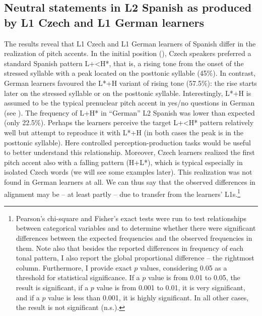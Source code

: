 \subsection{Neutral statements in L2 Spanish as produced by L1 Czech and L1 German learners}\label{sec:4.1.2}

The results reveal that L1 Czech and L1 German learners of Spanish differ in the realization of pitch accents. In the initial position (), Czech speakers preferred a standard Spanish pattern L+<H*, that is, a rising tone from the onset of the stressed syllable with a peak located on the posttonic syllable (45\%). In contrast, German learners favoured the L*+H variant of rising tone (57.5\%): the rise starts later on the stressed syllable or on the posttonic syllable. Interestingly, L*+H is assumed to be the typical prenuclear pitch accent in yes/no questions in German (see ). The frequency of L+H* in “German” L2 Spanish was lower than expected (only 22.5\%). Perhaps the learners perceive the target L+<H* pattern relatively well but attempt to reproduce it with L*+H (in both cases the peak is in the posttonic syllable). Here controlled perception-production tasks would be useful to better understand this relationship. Moreover, Czech learners realized the first pitch accent also with a falling pattern (H+L*), which is typical especially in isolated Czech words (we will see some examples later). This realization was not found in German learners at all. We can thus say that the observed differences in alignment may be -- at least partly -- due to transfer from the learners’ L1s.\footnote{Pearson’s chi-square and Fisher’s exact tests were run to test relationships between categorical variables and to determine whether there were significant differences between the expected frequencies and the observed frequencies in them. Note also that besides the reported differences in frequency of each tonal pattern, I also report the global proportional difference -- the rightmost column. Furthermore, I provide exact $p$ values, considering 0.05 as a threshold for statistical significance. If a $p$ value is from 0.01 to 0.05, the result is significant, if a $p$ value is from 0.001 to 0.01, it is very significant, and if a $p$ value is less than 0.001, it is highly significant. In all other cases, the result is not significant (n.s.).}

